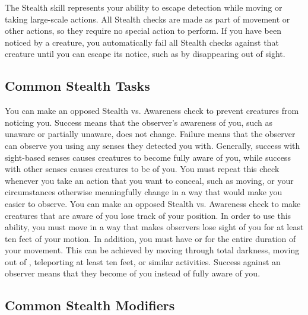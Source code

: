 \newpage
{}
        The Stealth skill represents your ability to escape detection while moving or taking large-scale actions.
        All Stealth checks are made as part of movement or other actions, so they require no special action to perform.
        If you have been noticed by a creature, you automatically fail all Stealth checks against that creature until you can escape its notice, such as by disappearing out of sight.

    \subsection{Common Stealth Tasks}
         You can make an opposed Stealth vs. Awareness check to prevent creatures from noticing you.
        Success means that the observer's awareness of you, such as unaware or partially unaware, does not change.
        Failure means that the observer can observe you using any senses they detected you with.
        Generally, success with sight-based senses causes creatures to become fully aware of you, while success with other senses causes creatures to be \partiallyunaware of you.
        You must repeat this check whenever you take an action that you want to conceal, such as moving, or your circumstances otherwise meaningfully change in a way that would make you easier to observe.
         You can make an opposed Stealth vs. Awareness check to make creatures that are aware of you lose track of your position.
        In order to use this ability, you must move in a way that makes observers lose sight of you for at least ten feet of your motion.
        In addition, you must have  or  for the entire duration of your movement.
        This can be achieved by moving through total darkness, moving out of , teleporting at least ten feet, or similar activities.
        Success against an observer means that they become \partiallyunaware of you instead of fully aware of you.

    \subsection{Common Stealth Modifiers}\label{Common Stealth Modifiers}

